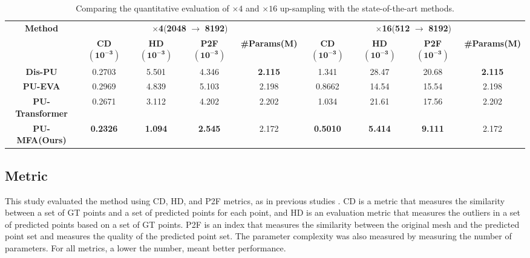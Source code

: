\documentclass{article}
\begin{document}
\begin{table*}[htb!]
\centering
\resizebox{\textwidth}{!}
{\begin{tabular}{@{}c|cccc|cccc@{}}
\toprule
\multirow{2}{*}{\textbf{Method}} & \multicolumn{4}{c|}{$\boldsymbol{\times}$\textbf{4}(\textbf{2048} $\boldsymbol{\rightarrow}$ \textbf{8192})}                                       & \multicolumn{4}{c}{$\boldsymbol{\times}$\textbf{16}(\textbf{512} $\boldsymbol{\rightarrow}$ \textbf{8192})}                              \\ \cmidrule(l){2-9} 
                        & \textbf{CD}$\mathbf{(10^{-3})}$     & \textbf{HD}$\mathbf{(10^{-3})}$   & \textbf{P2F}$\mathbf{(10^{-3})}$   & \textbf{\#Params(M)} & \textbf{CD}$\mathbf{(10^{-3})}$ & \textbf{HD}$\mathbf{(10^{-3})}$ & \textbf{P2F}$\mathbf{(10^{-3})}$ & \textbf{\#Params(M)} \\ \midrule
\textbf{Dis-PU}         & 0.2703          & 5.501          & 4.346          & \textbf{2.115}     & 1.341           & 28.47           & 20.68            & \textbf{2.115}                  \\
\textbf{PU-EVA}         & 0.2969           & 4.839              & 5.103              & 2.198              & 0.8662           & 14.54           & 15.54            & 2.198                  \\
\textbf{PU-Transformer} & 0.2671          & 3.112          & 4.202          & 2.202              & 1.034           & 21.61           & 17.56            & 2.202                  \\ \midrule
\textbf{PU-MFA(Ours)}           & \textbf{0.2326} & \textbf{1.094} & \textbf{2.545} & 2.172              & \textbf{0.5010}           & \textbf{5.414}           & \textbf{9.111}            & 2.172                  \\ \bottomrule
\end{tabular}}
\caption{Comparing the quantitative evaluation of $\times 4$ and $\times 16$ up-sampling with the state-of-the-art methods.}
\label{tab:pugan_test}
\end{table*}

\subsection{Metric}
\quad This study evaluated the method using CD, HD, and P2F metrics, as in previous studies \cite{li2021point,luo2021pu,qiu2021pu}. CD is a metric that measures the similarity between a set of GT  points and a set of predicted points for each point, and HD is an evaluation metric that measures the outliers in a set of predicted points based on a set of GT points. P2F is an index that measures the similarity between the original mesh and the predicted point set and measures the quality of the predicted point set. The parameter complexity was also measured by measuring the number of parameters. For all metrics, a lower the number, meant better performance.
\end{document}
